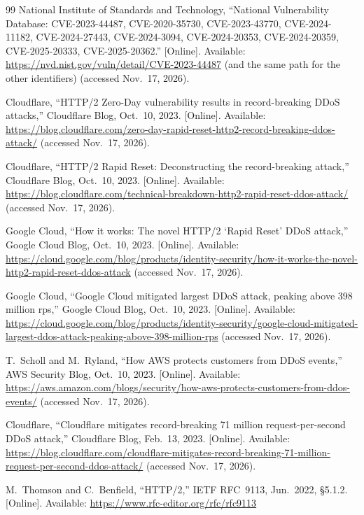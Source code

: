 \documentclass[11pt,a4paper]{article}
\begin{document}
\begin{thebibliography}{99}
National Institute of Standards and Technology, ``National Vulnerability Database: CVE-2023-44487, CVE-2020-35730, CVE-2023-43770,
CVE-2024-11182, CVE-2024-27443, CVE-2024-3094, CVE-2024-20353, CVE-2024-20359, CVE-2025-20333, CVE-2025-20362.'' [Online]. Available: \url{https://nvd.nist.gov/vuln/detail/CVE-2023-44487} (and the same path
for the other identifiers) (accessed Nov.~17, 2026).

Cloudflare, ``HTTP/2 Zero-Day vulnerability results in record-breaking DDoS attacks,'' Cloudflare Blog, Oct.~10, 2023. [Online]. Available:
\url{https://blog.cloudflare.com/zero-day-rapid-reset-http2-record-breaking-ddos-attack/} (accessed Nov.~17, 2026).

Cloudflare, ``HTTP/2 Rapid Reset: Deconstructing the record-breaking attack,'' Cloudflare Blog, Oct.~10, 2023. [Online]. Available:
\url{https://blog.cloudflare.com/technical-breakdown-http2-rapid-reset-ddos-attack/} (accessed Nov.~17, 2026).

Google Cloud, ``How it works: The novel HTTP/2 `Rapid Reset' DDoS attack,'' Google Cloud Blog, Oct.~10, 2023. [Online]. Available:
\url{https://cloud.google.com/blog/products/identity-security/how-it-works-the-novel-http2-rapid-reset-ddos-attack} (accessed Nov.~17, 2026).

Google Cloud, ``Google Cloud mitigated largest DDoS attack, peaking above 398 million rps,'' Google Cloud Blog, Oct.~10, 2023. [Online]. Available:
\url{https://cloud.google.com/blog/products/identity-security/google-cloud-mitigated-largest-ddos-attack-peaking-above-398-million-rps} (accessed Nov.~17, 2026).

T.~Scholl and M.~Ryland, ``How AWS protects customers from DDoS events,'' AWS Security Blog, Oct.~10, 2023. [Online]. Available:
\url{https://aws.amazon.com/blogs/security/how-aws-protects-customers-from-ddos-events/} (accessed Nov.~17, 2026).

Cloudflare, ``Cloudflare mitigates record-breaking 71 million request-per-second DDoS attack,'' Cloudflare Blog, Feb.~13, 2023. [Online]. Available:
\url{https://blog.cloudflare.com/cloudflare-mitigates-record-breaking-71-million-request-per-second-ddos-attack/} (accessed Nov.~17, 2026).

M.~Thomson and C.~Benfield, ``HTTP/2,'' IETF RFC~9113, Jun.~2022, \S5.1.2. [Online]. Available: \url{https://www.rfc-editor.org/rfc/rfc9113}


\end{thebibliography}
\end{document}

